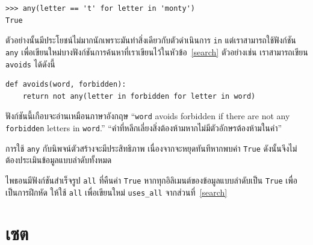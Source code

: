 \begin{verbatim}
>>> any(letter == 't' for letter in 'monty')
True
\end{verbatim}
%
ตัวอย่างนั้นมีประโยชน์ไม่มากนักเพราะมันทำสิ่งเดียวกับตัวดำเนินการ {\tt in}  แต่เราสามารถใช้ฟังก์ชัน  {\tt any} 
เพื่อเขียนใหม่บางฟังก์ชันการค้นหาที่เราเขียนไว้ในหัวข้อ~\ref{search} ตัวอย่างเช่น เราสามารถเขียน {\tt avoids} ได้ดังนี้

\begin{verbatim}
def avoids(word, forbidden):
    return not any(letter in forbidden for letter in word)
\end{verbatim}
%

ฟังก์ชันนี้เกือบจะอ่านเหมือนภาษาอังกฤษ ``{\tt word} avoids forbidden if there are not
any {\tt forbidden} letters in {\tt word}.'' ``คำที่หลีกเลี่ยงสิ่งต้องห้ามหากไม่มีตัวอักษรต้องห้ามในคำ''


การใช้ {\tt any} กับนิพจน์ตัวสร้างจะมีประสิทธิภาพ เนื่องจากจะหยุดทันทีหากพบค่า {\tt True} ดังนั้นจึงไม่ต้องประเมินข้อมูลแบบลำดับทั้งหมด


ไพธอนมีฟังก์ชันสำเร็จรูป {\tt all} ที่คืนค่า {\tt True} หากทุกอิลิเมนต์ของข้อมูลแบบลำดับเป็น {\tt True} 
เพื่อเป็นการฝึกหัด ให้ใช้ {\tt all} เพื่อเขียนใหม่ \verb"uses_all" จากส่วนที่~\ref{search}


\section{เซต } %
\label{sets}

